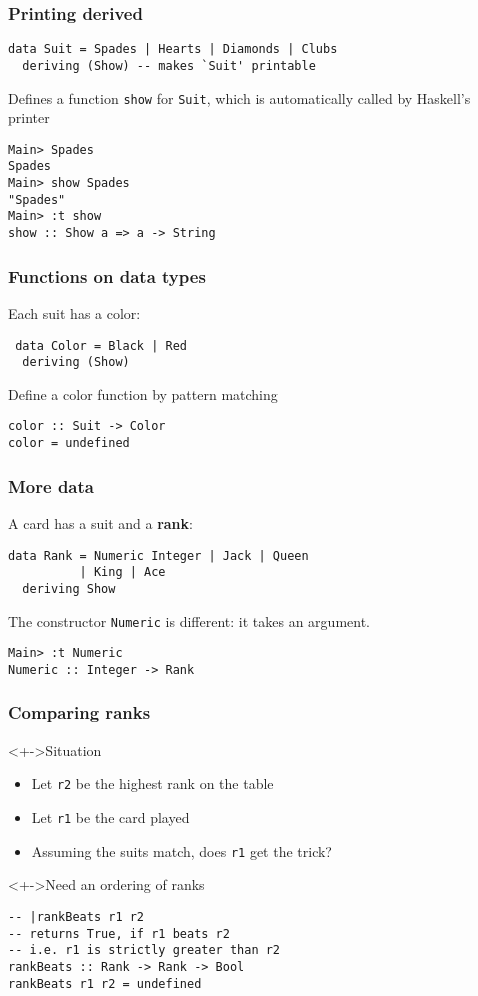 \documentclass{beamer}
\begin{document}
\begin{frame}
  \frametitle{Printing derived}
\begin{verbatim}
data Suit = Spades | Hearts | Diamonds | Clubs
  deriving (Show) -- makes `Suit' printable
\end{verbatim}
Defines a function \texttt{show} for \texttt{Suit}, which is
automatically called by Haskell's printer
\begin{verbatim}
Main> Spades
Spades
Main> show Spades
"Spades"
Main> :t show 
show :: Show a => a -> String
\end{verbatim}
\end{frame}
\begin{frame}
  \frametitle{Functions on data types}
   Each suit has a color:
\begin{verbatim}
 data Color = Black | Red
  deriving (Show)
\end{verbatim}
   Define a color function by pattern matching
\begin{verbatim}
color :: Suit -> Color
color = undefined
\end{verbatim}
\end{frame}
\begin{frame}
  \frametitle{More data}
  A card has a suit and a \textbf{rank}:
\begin{verbatim}
data Rank = Numeric Integer | Jack | Queen
          | King | Ace
  deriving Show
\end{verbatim}
The constructor \texttt{Numeric} is different: it takes an argument.
\begin{verbatim}
Main> :t Numeric
Numeric :: Integer -> Rank
\end{verbatim}
\end{frame}
\begin{frame}[fragile]
  \frametitle{Comparing ranks}
  \begin{block}<+->{Situation}
    \begin{itemize}
    \item Let \texttt{r2} be the highest rank on the table
    \item Let \texttt{r1} be the card played
    \item Assuming the suits match, does \texttt{r1} get the trick?
    \end{itemize}
  \end{block}
  \begin{block}<+->{Need an ordering of ranks}
\begin{verbatim}
-- |rankBeats r1 r2
-- returns True, if r1 beats r2
-- i.e. r1 is strictly greater than r2
rankBeats :: Rank -> Rank -> Bool
rankBeats r1 r2 = undefined
\end{verbatim}
  \end{block}
\end{frame}
\end{document}
